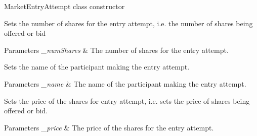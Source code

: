 
\begin{DoxyRefList}
\item[\label{todo__todo000001}%
\hypertarget{todo__todo000001}{}%
Member \hyperlink{classfinancialmarketsimulator_1_1_market_entry_attempt_a9b2f8a9eef7975bc053907e2ea05c779}{financialmarketsimulator.Market\+Entry\+Attempt.Market\+Entry\+Attempt} (double pr, int num\+Shares, String name)]Market\+Entry\+Attempt class constructor 
\item[\label{todo__todo000003}%
\hypertarget{todo__todo000003}{}%
Member \hyperlink{classfinancialmarketsimulator_1_1_market_entry_attempt_a27476573fd4a0aa03270c648500a3c98}{financialmarketsimulator.Market\+Entry\+Attempt.set\+Number\+Of\+Shares} (int \+\_\+num\+Shares)]Sets the number of shares for the entry attempt, i.\+e. the number of shares being offered or bid 
\begin{DoxyParams}{Parameters}
{\em \+\_\+num\+Shares} & The number of shares for the entry attempt.  \\
\hline
\end{DoxyParams}

\item[\label{todo__todo000004}%
\hypertarget{todo__todo000004}{}%
Member \hyperlink{classfinancialmarketsimulator_1_1_market_entry_attempt_af2b5d63e0ac8d2e39cf474e128739c8a}{financialmarketsimulator.Market\+Entry\+Attempt.set\+Participant\+Name} (String \+\_\+name)]Sets the name of the participant making the entry attempt. 
\begin{DoxyParams}{Parameters}
{\em \+\_\+name} & The name of the participant making the entry attempt.  \\
\hline
\end{DoxyParams}

\item[\label{todo__todo000002}%
\hypertarget{todo__todo000002}{}%
Member \hyperlink{classfinancialmarketsimulator_1_1_market_entry_attempt_ac350f88eed14da376cb58aa920df2f38}{financialmarketsimulator.Market\+Entry\+Attempt.set\+Price} (double \+\_\+price)]Sets the price of the shares for entry attempt, i.\+e. sets the price of shares being offered or bid. 
\begin{DoxyParams}{Parameters}
{\em \+\_\+price} & The price of the shares for the entry attempt.  \\
\hline
\end{DoxyParams}


\end{DoxyRefList}
